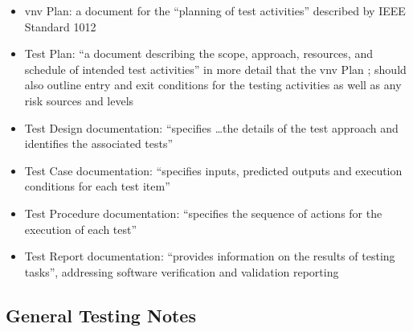 \begin{itemize}
      \item \acf{vnv} Plan: a document for the ``planning of test activities''
            described by IEEE Standard 1012 \citep[p.~411]{vanVliet2000}
      \item Test Plan: ``a document describing the scope, approach, resources,
            and schedule of intended test activities'' in more detail that the
            \acs{vnv} Plan \citep[pp.~412-413]{vanVliet2000};
            should also outline entry and exit conditions for the testing
            activities as well as any risk sources and levels
            \citep[p.~445]{PetersAndPedrycz2000}
      \item Test Design documentation: ``specifies \dots the details of the
            test approach and identifies the associated tests''
            \citep[p.~413]{vanVliet2000}
      \item Test Case documentation: ``specifies inputs, predicted outputs and
            execution conditions for each test item''
            \citep[p.~413]{vanVliet2000}
      \item Test Procedure documentation: ``specifies the sequence of actions
            for the execution of each test'' \citep[p.~413]{vanVliet2000}
      \item Test Report documentation: ``provides information on the results of
            testing tasks'', addressing software verification and validation
            reporting \citep[p.~413]{vanVliet2000}
\end{itemize}

\subsection{General Testing Notes}

